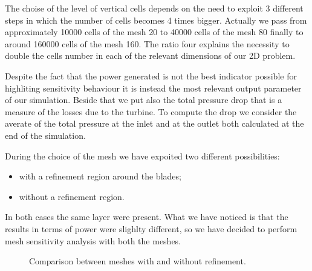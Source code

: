 \documentclass[a4paper,12pt]{article}
\begin{document}
The choise of the level of vertical cells depends on the need to exploit 3 different steps in which the number of cells becomes 4 times bigger. Actually we pass from approximately 10000 cells of the mesh 20 to 40000 cells of the mesh 80 finally to around 160000 cells of the mesh 160. 
The ratio four explains the necessity to double the cells number in each of the relevant dimensions of our 2D problem.

Despite the fact that the power generated is not the best indicator possible for highliting sensitivity behaviour it is instead the most relevant output parameter of our simulation.
Beside that we put also the total pressure drop that is a measure of the losses due to the turbine.
To compute the drop we consider the averate of the total pressure at the inlet and at the outlet both calculated at the end of the simulation.

During the choice of the mesh we have expoited two different possibilities:
\begin{itemize}
\item with a refinement region around the blades;
\item without a refinement region.
\end{itemize}
In both cases the same layer were present.
What we have noticed is that the results in terms of power were slighlty different, so we have decided to perform mesh sensitivity analysis with both the meshes.

\begin{figure}
\hfill
{}
\caption{Comparison between meshes with and without refinement.}
\end{figure}
\end{document}
